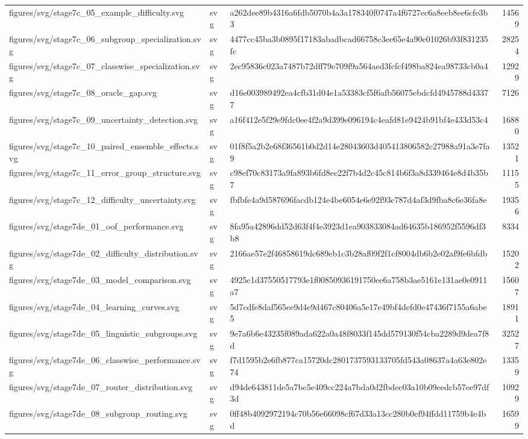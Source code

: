 \begin{tabular}{lllr}
figures/svg/stage7c_05_example_difficulty.svg & svg & a262dee89b4316a6fdb5070b4a3a178340f0747a4f6727ec6a8eeb8ee6cfe3b3 & 14569 \\
figures/svg/stage7c_06_subgroup_specialization.svg & svg & 4477cc45ba3b0895f17183abadbcad66758c3ee65e4a90e01026b93f831235fc & 28254 \\
figures/svg/stage7c_07_classwise_specialization.svg & svg & 2ec95836c023a7487b72dff79e709f9a564aed3fcfcf498ba824ea98733cb0a4 & 12929 \\
figures/svg/stage7c_08_oracle_gap.svg & svg & d16e003989492ea4cfb31d04e1a53383cf5f6afb56075ebdcfd4945788d43377 & 7126 \\
figures/svg/stage7c_09_uncertainty_detection.svg & svg & a16f412e5f29e9fdc0ee4f2a9d399e096194c4eafd81e9424b91bf4e433d53c4 & 16880 \\
figures/svg/stage7c_10_paired_ensemble_effects.svg & svg & 01f8f5a2b2e68f36561b0d2d14e28043603d405413806582c27988a91a3e7fa9 & 13521 \\
figures/svg/stage7c_11_error_group_structure.svg & svg & c98ef70c83173a9fa893b6fd8ec22f7b4d2c45c814b6f3a8d339464e8d4b35b7 & 11155 \\
figures/svg/stage7c_12_difficulty_uncertainty.svg & svg & fbfbfe4a9d587696facdb124e4be6054e6e92f93c787d4af3d9fba8c6e36fa8e & 19356 \\
figures/svg/stage7de_01_oof_performance.svg & svg & 8fa95a42896dd52d63f4f4e3923d1ea903833084ad64635b186952f5596df3b8 & 8334 \\
figures/svg/stage7de_02_difficulty_distribution.svg & svg & 2166ae57e2f46858619dc689eb1c3b28af09f2f1cf8004db6b2e02af9fe6bfdb & 15202 \\
figures/svg/stage7de_03_model_comparison.svg & svg & 4925c1d37550517793e1f00850936191750ee6a758b3ae5161e131ae0e0911a7 & 15607 \\
figures/svg/stage7de_04_learning_curves.svg & svg & 5d7cdfe8daf565ee9d4e9d467c80406a5e17e49bf4defd0e47436f7155a6abe5 & 18911 \\
figures/svg/stage7de_05_linguistic_subgroups.svg & svg & 9e7a6b6e43235f089ada622a0a48f8033f145dd579130f54cba2289d9dea7f8d & 32527 \\
figures/svg/stage7de_06_classwise_performance.svg & svg & f7d1595b2e6fb877ca15720dc2801737593133705fd543a08637a4a63e802e74 & 13359 \\
figures/svg/stage7de_07_router_distribution.svg & svg & d94de643811de5a7bc5e409cc224a7bda0d2fbdec03a10b09eedcb57ee97df3d & 10929 \\
figures/svg/stage7de_08_subgroup_routing.svg & svg & 0ff48b4092972194c70b56e66098cf67d33a13cc280b0ef94ffdd11759b4e4bd & 16599 \\

\end{tabular}
